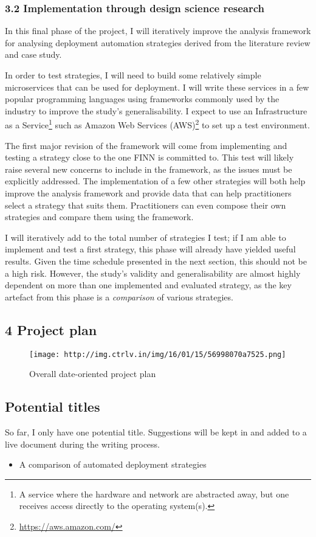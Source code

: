 \subsubsection{3.2 Implementation through design science
research}\label{implementation-through-design-science-research}

In this final phase of the project, I will iteratively improve the
analysis framework for analysing deployment automation strategies
derived from the literature review and case study.

In order to test strategies, I will need to build some relatively simple
microservices that can be used for deployment. I will write these
services in a few popular programming languages using frameworks
commonly used by the industry to improve the study's generalisability. I
expect to use an Infrastructure as a
Service\footnote{A service where the hardware and network are abstracted away, but one receives access directly to the operating system(s).}
such as Amazon Web Services
(AWS)\footnote{\url{https://aws.amazon.com/}} to set up a test
environment.

The first major revision of the framework will come from implementing
and testing a strategy close to the one FINN is committed to. This test
will likely raise several new concerns to include in the framework, as
the issues must be explicitly addressed. The implementation of a few
other strategies will both help improve the analysis framework and
provide data that can help practitioners select a strategy that suits
them. Practitioners can even compose their own strategies and compare
them using the framework.

I will iteratively add to the total number of strategies I test; if I am
able to implement and test a first strategy, this phase will already
have yielded useful results. Given the time schedule presented in the
next section, this should not be a high risk. However, the study's
validity and generalisability are almost highly dependent on more than
one implemented and evaluated strategy, as the key artefact from this
phase is a \emph{comparison} of various strategies.

\subsection{4 Project plan}\label{project-plan}

\begin{figure}[htbp]
\centering
\texttt{[image: http://img.ctrlv.in/img/16/01/15/56998070a7525.png]}
\caption{Overall date-oriented project plan}
\end{figure}

\subsection{Potential titles}\label{potential-titles}

So far, I only have one potential title. Suggestions will be kept in and
added to a live document during the writing process.

\begin{itemize}
\tightlist
\item
  A comparison of automated deployment strategies
\end{itemize}

